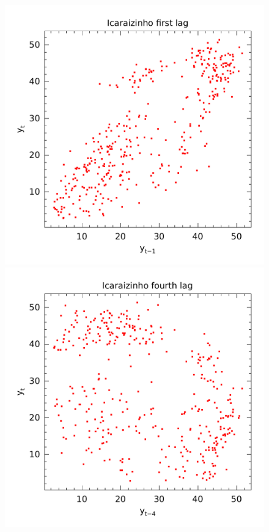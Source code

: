 \begin{figure}
  \centering
  \begin{minipage}[t]{\linewidth}
    \centering
    \begin{minipage}[t]{0.45\linewidth}
      \centering     \includegraphics[width=\textwidth]{Figuras/Icaraizinho/icaraizinho-1-lag.pdf}
    \end{minipage}
    \begin{minipage}[b]{0.45\linewidth}
      \centering     \includegraphics[width=\textwidth]{Figuras/Icaraizinho/icaraizinho-4-lag.pdf}

\end{minipage}
\end{minipage}
\end{figure}
